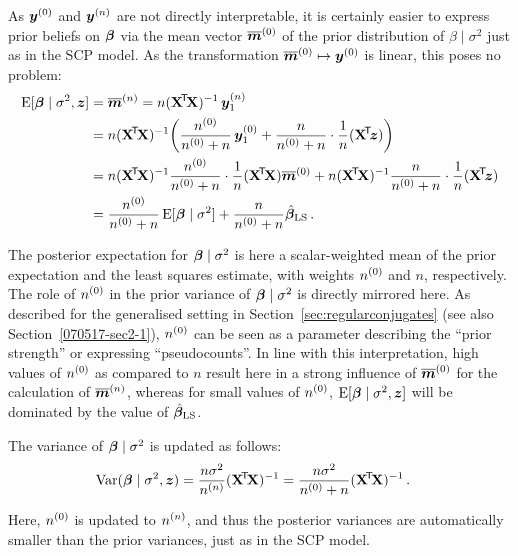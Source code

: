 As ${\bm y}^{(0)}$ and ${\bm y}^{(n)}$ are not directly interpretable, it is certainly easier 
to express prior beliefs on $\boldsymbol{\beta}$ via the mean vector $\overline{{\bm m}}^{(0)}$ of the prior distribution of
$\beta\mid\sigma^2$ just as in the SCP model.
As the transformation $\overline{{\bm m}}^{(0)} \mapsto {\bm y}^{(0)}$ is linear, this poses no problem:
\begin{align}
\E[\bbeta\mid\sigma^2,\z]
 &= \tmn %
  = n (\XtX)^{-1}\, \byn_1 \nonumber\\
 &= n (\XtX)^{-1} \bigg(\frac{\nz}{\nz + n}\,\byz_1 + \frac{n}{\nz + n}\cdot \frac{1}{n}(\Xtz) \bigg) \nonumber\\
 &= n (\XtX)^{-1} \frac{\nz}{\nz + n} \cdot \frac{1}{n}(\XtX) \tmz
  + n (\XtX)^{-1} \frac{n}  {\nz + n} \cdot \frac{1}{n}(\Xtz) \nonumber\\
 &= \frac{\nz}{\nz + n} \E[\bbeta\mid\sigma^2]
  + \frac{n}  {\nz + n} \bls\,.
  \label{equ:update_beta}
\end{align}

The posterior expectation for $\boldsymbol{\beta}\mid\sigma^2$ is here a
scalar-weighted mean of the prior expectation and the least squares
estimate, with weights $n^{(0)}$ and $n$, respectively. The role of
$n^{(0)}$ in the prior variance of $\boldsymbol{\beta}\mid\sigma^2$ is directly
mirrored here. As described for the generalised setting in
Section~\ref{sec:regularconjugates} (see also Section~\ref{070517-sec2-1}), $n^{(0)}$ can
be seen as a parameter describing the ``prior strength'' or
expressing ``pseudocounts''. In line with this interpretation, high
values of $n^{(0)}$ as compared to $n$ result here in a strong
influence of $\overline{{\bm m}}^{(0)}$ for the calculation of $\overline{{\bm m}}^{(n)}$, whereas for small
values of $n^{(0)}$, $\operatorname{E}[\boldsymbol{\beta}\mid\sigma^2,{\bm z}]$ %
will be dominated by the value of $\hat{\boldsymbol{\beta}}_\text{LS}$.

The variance of $\boldsymbol{\beta}\mid\sigma^2$ is updated as follows:
\begin{align}
\V(\bbeta\mid\sigma^2,\z) &= \frac{n\sigma^2}{\nn}(\XtX)^{-1} %
                           = \frac{n\sigma^2}{\nz + n}(\XtX)^{-1}\,. \nonumber%
\end{align}

Here, $n^{(0)}$ is updated to $n^{(n)}$, and thus the posterior variances are
automatically smaller than the prior variances, just as in the SCP model.
%
%

